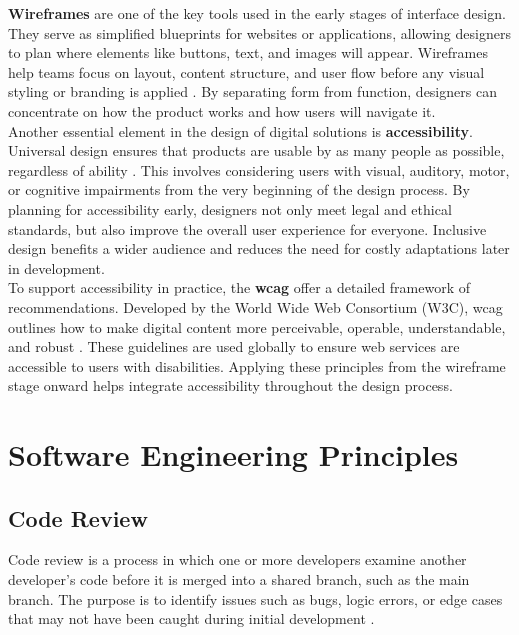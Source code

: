 {\textbf{Wireframes} are one of the key tools used in the early stages of interface design. They serve as simplified blueprints for websites or applications, allowing designers to plan where elements like buttons, text, and images will appear. Wireframes help teams focus on layout, content structure, and user flow before any visual styling or branding is applied \cite{balsamiq:wireframe}. By separating form from function, designers can concentrate on how the product works and how users will navigate it. \\

Another essential element in the design of digital solutions is \textbf{accessibility}. Universal design ensures that products are usable by as many people as possible, regardless of ability \cite{uutilsynet:universellutforming}. This involves considering users with visual, auditory, motor, or cognitive impairments from the very beginning of the design process. By planning for accessibility early, designers not only meet legal and ethical standards, but also improve the overall user experience for everyone. Inclusive design benefits a wider audience and reduces the need for costly adaptations later in development. \\

To support accessibility in practice, the \textbf{\gls{wcag}} offer a detailed framework of recommendations. Developed by the World Wide Web Consortium (W3C), \gls{wcag} outlines how to make digital content more perceivable, operable, understandable, and robust \cite{levelaccess:wcag}. These guidelines are used globally to ensure web services are accessible to users with disabilities. Applying these principles from the wireframe stage onward helps integrate accessibility throughout the design process.

\section{Software Engineering Principles}
\label{sec:software-engineering-principles}

\subsection{Code Review}
\label{subsec:code-review}

Code review is a process in which one or more developers examine another developer’s code before it is merged into a shared branch, such as the main branch. The purpose is to identify issues such as bugs, logic errors, or edge cases that may not have been caught during initial development \cite{gitlab:code-review}. \\

}
